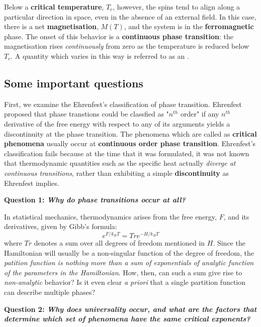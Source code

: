 \documentclass[12pt,titlepage]{article}
\numberwithin{equation}{section}
\begin{document}
Below a \textbf{critical temperature}, $T_c$, however, the spins tend to align along a particular direction in space, even in the absence of an external field. In this case, there is a net \textbf{magnetisation}, $M(T)$, and the system is in the \textbf{ferromagnetic} phase. The onset of this behavior is a \textbf{continuous phase transition}: the magnetisation rises \textit{continuously} from zero as the temperature is reduced below $T_c$. A quantity which varies in this way is referred to as an \textbf{}.

\subsection{Some important questions}
First, we examine the Ehrenfest's classification of phase transition. Ehrenfest proposed that phase transtions could be classfied as "$n^{th}$ order" if any $n^{th}$ derivative of the free energy with respect to any of its arguments yields a discontinuity at the phase transition. The phenomena which are called as \textbf{critical phenomena} usually occur at \textbf{continuous order phase transition}. Ehrenfest's classification fails because at the time that it was formulated, it was not known that thermodynamic quantities such as the specific heat actually \emph{diverge at continuous transitions}, rather than exhibiting a simple \textbf{discontinuity} as Ehrenfest implies.

\textbf{Question 1: \emph{Why do phase transitions occur at all?}}

In statistical mechanics, thermodynamics arises from the free energy, $F$, and its derivatives, given by Gibb's formula:
\begin{equation}
    e^{F/k_BT} = Tr e^{-H/k_BT}
\end{equation}
where $Tr$ denotes a sum over all degrees of freedom mentioned in $H$. Since the Hamiltonian will usually be a non-singular function of the degree of freedom, the \emph{patition function is nothing more than a sum of exponentials of analytic function of the parameters in the Hamiltonian}. How, then, can such a sum give rise to \emph{non-analytic} behavior? Is it even clear \emph{a priori} that a single partition function can describe multiple phases?

\textbf{Question 2: \emph{Why does universality occur, and what are the factors that determine which set of phenomena have the same critical exponents?}}
\end{document}
